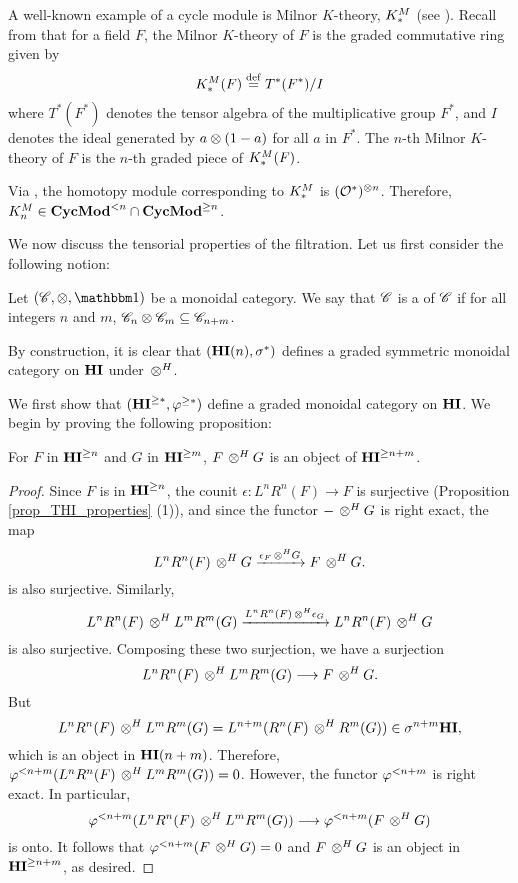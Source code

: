\begin{ex}\label{ex_milK}
A well-known example of a cycle module is Milnor $K$-theory,
$K^M_*$ (see \cite[1.4, 2.5]{Rost96}). Recall from \cite{MilK} that 
for a field $F$, the Milnor $K$-theory of $F$ is the graded 
commutative ring given by
\[
K^M_*(F) \stackrel{\mathrm{def}}{=} T^*(F^*)/I
\]
where $T^*(F^*)$ denotes the tensor algebra of the multiplicative 
group $F^*$, and $I$ denotes the ideal generated by $a \otimes 
(1 - a)$ for all $a$ in $F^*$. The $n$-th Milnor $K$-theory of $F$ 
is the $n$-th graded piece of $K^M_*(F)$.

Via \cite[3.7]{DegModHom}, the homotopy module corresponding to 
$K^M_*$ is $(\mathcal{O}^*)^{\otimes n}$. Therefore, $K^M_n \in
\mathbf{CycMod}^{< n} \cap \mathbf{CycMod}^{\geq n}$.
\end{ex}

We now discuss the tensorial properties of the filtration. Let us
first consider the following notion:

\begin{defn}\label{def_graded_tensor}
Let $(\Cat{C}, \tensor, \Unit)$ be a monoidal category.
We say that $\mathscr{C}$ is a  of $\mathscr{C}$ if for all 
integers $n$ and $m$, $\mathscr{C}_n \otimes \mathscr{C}_m \subseteq
\mathscr{C}_{n + m}$.
\end{defn}

\begin{ex}
By construction, it is clear that $(\mathbf{HI}(n), \sigma^{*})$ 
defines a graded symmetric monoidal category on $\mathbf{HI}$ under
$\,\otimes^H$.
\end{ex}

We first show that $(\mathbf{HI}^{\geq *}, \varphi^{\geq *})$ define a graded
monoidal category on $\mathbf{HI}$. We begin by proving the following
proposition:

\begin{prop}\label{prop_tensor_and_tfilt_HI}
For $F$ in $\mathbf{HI}^{\geq n}$ and $G$ in $\mathbf{HI}^{\geq m}$, $F \,\otimes^H G$
is an object of $\mathbf{HI}^{\geq n + m}$.
\end{prop}
\begin{proof}
Since $F$ is in $\mathbf{HI}^{\geq n}$, the counit $\epsilon: L^nR^n(F) \to F$ 
is surjective (Proposition \ref{prop_THI_properties} (1)), and since 
the functor $- \,\otimes^H G$ is right exact, the map
\[
L^nR^n(F) \,\otimes^H G \xrightarrow{\epsilon_F \,\otimes^H G} F \,\otimes^H G.
\]
is also surjective. Similarly,
\[
L^nR^n(F) \,\otimes^H L^mR^m(G) \xrightarrow{L^nR^n(F) \,\otimes^H \epsilon_G}
L^nR^n(F) \,\otimes^H G
\]
is also surjective. Composing these two surjection, we have a 
surjection
\[
L^nR^n(F) \,\otimes^H L^mR^m(G) \longrightarrow F \,\otimes^H G.
\]
But 
\[
L^nR^n(F) \,\otimes^H L^mR^m(G) = L^{n + m}(R^n(F) \,\otimes^H R^m(G)) \in
\sigma^{n + m}\mathbf{HI},
\]
which is an object in $\mathbf{HI}(n + m)$. Therefore, 
$\varphi^{< n + m}(L^nR^n(F) \,\otimes^H L^mR^m(G)) = 0$. However, the functor 
$\varphi^{< n + m}$ is right exact. In particular,
\[
\varphi^{< n + m}(L^nR^n(F) \,\otimes^H L^mR^m(G)) \longrightarrow
   \varphi^{< n + m}(F \,\otimes^H G)
\]
is onto. It follows that $\varphi^{< n + m}(F \,\otimes^H G) = 0$ and
$F \,\otimes^H G$ is an object in $\mathbf{HI}^{\geq n + m}$, as desired.
\end{proof}

